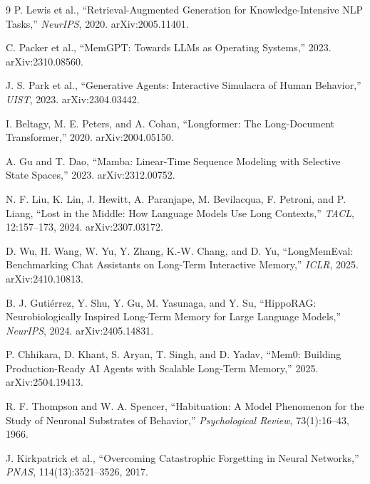 \documentclass[11pt]{article}
\begin{document}
\begin{thebibliography}{9}
P. Lewis et al., ``Retrieval-Augmented Generation for Knowledge-Intensive NLP Tasks,'' \emph{NeurIPS}, 2020. arXiv:2005.11401.

C. Packer et al., ``MemGPT: Towards LLMs as Operating Systems,'' 2023. arXiv:2310.08560.

J. S. Park et al., ``Generative Agents: Interactive Simulacra of Human Behavior,'' \emph{UIST}, 2023. arXiv:2304.03442.

I. Beltagy, M. E. Peters, and A. Cohan, ``Longformer: The Long-Document Transformer,'' 2020. arXiv:2004.05150.

A. Gu and T. Dao, ``Mamba: Linear-Time Sequence Modeling with Selective State Spaces,'' 2023. arXiv:2312.00752.

N. F. Liu, K. Lin, J. Hewitt, A. Paranjape, M. Bevilacqua, F. Petroni, and P. Liang, ``Lost in the Middle: How Language Models Use Long Contexts,'' \emph{TACL}, 12:157--173, 2024. arXiv:2307.03172.

D. Wu, H. Wang, W. Yu, Y. Zhang, K.-W. Chang, and D. Yu, ``LongMemEval: Benchmarking Chat Assistants on Long-Term Interactive Memory,'' \emph{ICLR}, 2025. arXiv:2410.10813.

B. J. Guti\'errez, Y. Shu, Y. Gu, M. Yasunaga, and Y. Su, ``HippoRAG: Neurobiologically Inspired Long-Term Memory for Large Language Models,'' \emph{NeurIPS}, 2024. arXiv:2405.14831.

P. Chhikara, D. Khant, S. Aryan, T. Singh, and D. Yadav, ``Mem0: Building Production-Ready AI Agents with Scalable Long-Term Memory,'' 2025. arXiv:2504.19413.

R. F. Thompson and W. A. Spencer, ``Habituation: A Model Phenomenon for the Study of Neuronal Substrates of Behavior,'' \emph{Psychological Review}, 73(1):16--43, 1966.

J. Kirkpatrick et al., ``Overcoming Catastrophic Forgetting in Neural Networks,'' \emph{PNAS}, 114(13):3521--3526, 2017.
\end{thebibliography}
\end{document}
